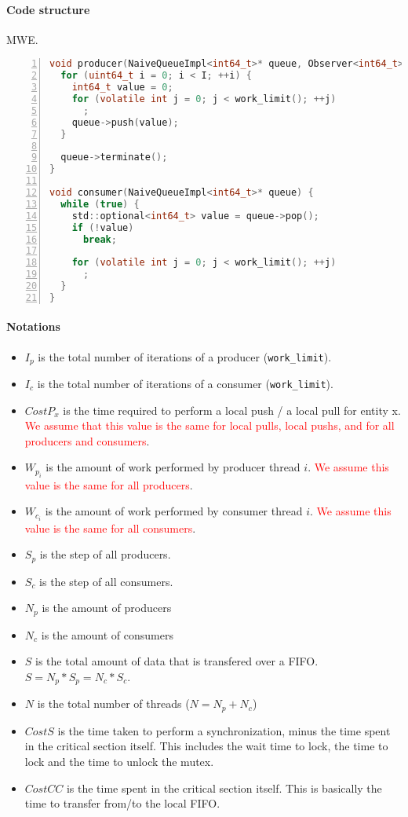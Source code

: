 \documentclass[a4paper,11pt]{article}
\begin{document}

\paragraph{Code structure} MWE.

\begin{lstlisting}[language=c,numbers=left,tabsize=2]
void producer(NaiveQueueImpl<int64_t>* queue, Observer<int64_t>* observer) {
  for (uint64_t i = 0; i < I; ++i) {
    int64_t value = 0;
    for (volatile int j = 0; j < work_limit(); ++j)
      ;
    queue->push(value);
  }

  queue->terminate();
}

void consumer(NaiveQueueImpl<int64_t>* queue) {
  while (true) {
    std::optional<int64_t> value = queue->pop();
    if (!value)
      break;

    for (volatile int j = 0; j < work_limit(); ++j)
      ;
  }
}
\end{lstlisting}

\paragraph{Notations}

\begin{itemize}
    \item $ I_p $ is the total number of iterations of a producer (\texttt{work\_limit}).
    \item $ I_c $ is the total number of iterations of a consumer (\texttt{work\_limit}).
    \item $ CostP_x $ is the time required to perform a local push / a local pull for entity x. \textcolor{red}{We assume that this value is the same for local pulls, local pushs, and for all producers and consumers}.
    \item $ W_{p_i} $ is the amount of work performed by producer thread $ i $. \textcolor{red}{We assume this value is the same for all producers}.
    \item $ W_{c_i} $ is the amount of work performed by consumer thread $ i $. \textcolor{red}{We assume this value is the same for all consumers}.
    \item $ S_p $ is the step of all producers.
    \item $ S_c $ is the step of all consumers.
    \item $ N_p $ is the amount of producers
    \item $ N_c $ is the amount of consumers
    \item $ S $ is the total amount of data that is transfered over a FIFO. $ S = N_p * S_p = N_c * S_c $.
    \item $ N $ is the total number of threads ($ N = N_p + N_c $)
    \item $ CostS $ is the time taken to perform a synchronization, minus the time spent in the critical section itself. This includes the wait time to lock, the time to lock and the time to unlock the mutex.
    \item $ CostCC $ is the time spent in the critical section itself. This is basically the time to transfer from/to the local FIFO.
\end{itemize}
\end{document}
